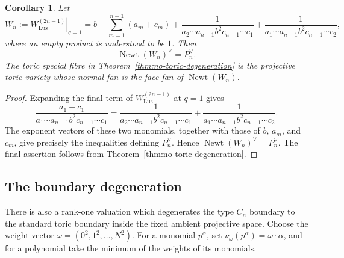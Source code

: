 \documentclass{article}
\newtheorem{cor}[thm]{Corollary}
\begin{document}
\begin{cor}
Let
\[
W_n:=\left.W_{\mathrm{Lus}}^{(2n-1)}\right|_{q=1}
=
b+
\sum_{m=1}^{n-1}(a_m+c_m)
+
\frac{1}{a_2\cdots a_{n-1}b^2c_{n-1}\cdots c_1}
+
\frac{1}{a_1\cdots a_{n-1}b^2c_{n-1}\cdots c_2},
\]
where an empty product is understood to be \(1\). Then
\[
\operatorname{Newt}(W_n)^\vee=P_n^\vee.
\]
The toric special fibre in Theorem~\ref{thm:no-toric-degeneration} is the projective toric variety whose normal fan is the face fan of \(\operatorname{Newt}(W_n)\).
\end{cor}

\begin{proof}
Expanding the final term of \(W_{\mathrm{Lus}}^{(2n-1)}\) at \(q=1\) gives
\[
\frac{a_1+c_1}
{a_1\cdots a_{n-1}b^2c_{n-1}\cdots c_1}
=
\frac{1}
{a_2\cdots a_{n-1}b^2c_{n-1}\cdots c_1}
+
\frac{1}
{a_1\cdots a_{n-1}b^2c_{n-1}\cdots c_2}.
\]
The exponent vectors of these two monomials, together with those of \(b\), \(a_m\), and \(c_m\), give precisely the inequalities defining \(P_n^\vee\). Hence \(\operatorname{Newt}(W_n)^\vee=P_n^\vee\). The final assertion follows from Theorem~\ref{thm:no-toric-degeneration}.
\end{proof}

\subsection{The boundary degeneration}
There is also a rank-one valuation which degenerates the type \(C_n\) boundary to the standard toric boundary inside the fixed ambient projective space. Choose the weight vector \(\omega=(0^2,1^2,\ldots,N^2)\). For a monomial \(p^\alpha\), set \(\nu_\omega(p^\alpha)=\omega\cdot\alpha\), and for a polynomial take the minimum of the weights of its monomials.
\end{document}
